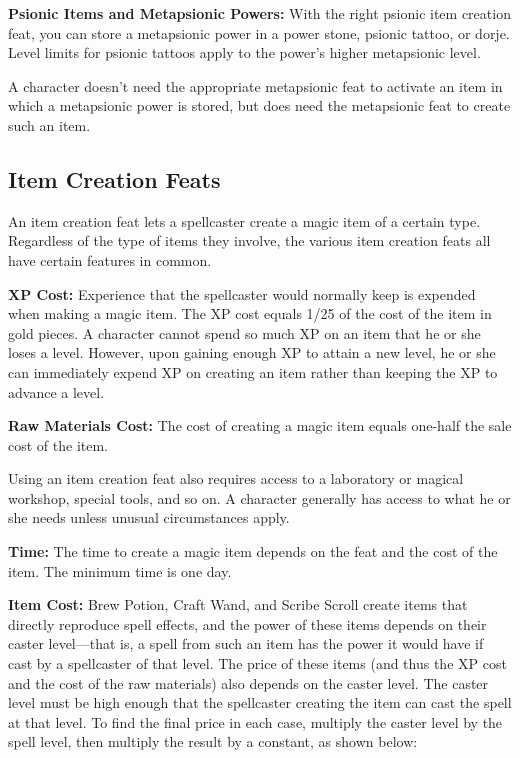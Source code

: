 \textbf{Psionic Items and Metapsionic Powers:} With the right psionic item creation feat, you can store a metapsionic power in a power stone, psionic tattoo, or dorje. Level limits for psionic tattoos apply to the power's higher metapsionic level.

A character doesn't need the appropriate metapsionic feat to activate an item in which a metapsionic power is stored, but does need the metapsionic feat to create such an item.

\subsection{Item Creation Feats}
An item creation feat lets a spellcaster create a magic item of a certain type. Regardless of the type of items they involve, the various item creation feats all have certain features in common.

\textbf{XP Cost:} Experience that the spellcaster would normally keep is expended when making a magic item. The XP cost equals 1/25 of the cost of the item in gold pieces. A character cannot spend so much XP on an item that he or she loses a level. However, upon gaining enough XP to attain a new level, he or she can immediately expend XP on creating an item rather than keeping the XP to advance a level.

\textbf{Raw Materials Cost:} The cost of creating a magic item equals one-half the sale cost of the item.

Using an item creation feat also requires access to a laboratory or magical workshop, special tools, and so on. A character generally has access to what he or she needs unless unusual circumstances apply.

\textbf{Time:} The time to create a magic item depends on the feat and the cost of the item. The minimum time is one day.

\textbf{Item Cost:} Brew Potion, Craft Wand, and Scribe Scroll create items that directly reproduce spell effects, and the power of these items depends on their caster level---that is, a spell from such an item has the power it would have if cast by a spellcaster of that level. The price of these items (and thus the XP cost and the cost of the raw materials) also depends on the caster level. The caster level must be high enough that the spellcaster creating the item can cast the spell at that level. To find the final price in each case, multiply the caster level by the spell level, then multiply the result by a constant, as shown below:

